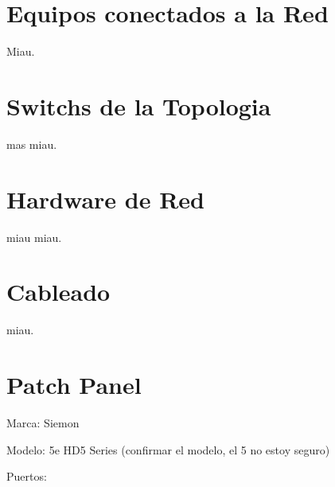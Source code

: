\documentclass[spanish]{udpreport}
\begin{document}
\section{Equipos conectados a la Red}
Miau.

\section{Switchs de la Topologia}
mas miau.

\section{Hardware de Red}
miau miau.

\section{Cableado}
miau.

\section{Patch Panel}
Marca: Siemon

Modelo: 5e HD5 Series (confirmar el modelo, el 5 no estoy seguro)

Puertos:



\listoffigures
\end{document}
